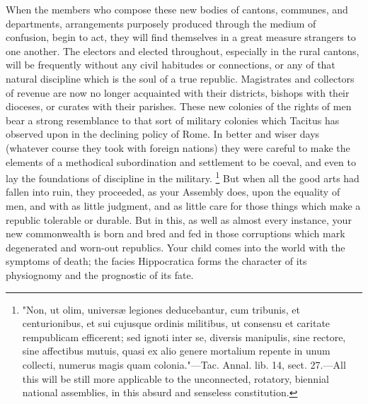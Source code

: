 When the members who compose these new bodies of cantons, communes, and departments, arrangements purposely produced through the medium of confusion, begin to act, they will find themselves in a great measure strangers to one another. The electors and elected throughout, especially in the rural cantons, will be frequently without any civil habitudes or connections, or any of that natural discipline which is the soul of a true republic. Magistrates and collectors of revenue are now no longer acquainted with their districts, bishops with their dioceses, or curates with their parishes. These new colonies of the rights of men bear a strong resemblance to that sort of military colonies which Tacitus has observed upon in the declining policy of Rome. In better and wiser days (whatever course they took with foreign nations) they were careful to make the elements of a methodical subordination and settlement to be coeval, and even to lay the foundations of discipline in the military.
\footnote{ "Non, ut olim, universæ legiones deducebantur, cum tribunis, et centurionibus, et sui cujusque ordinis militibus, ut consensu et caritate rempublicam efficerent; sed ignoti inter se, diversis manipulis, sine rectore, sine affectibus mutuis, quasi ex alio genere mortalium repente in unum collecti, numerus magis quam colonia."—Tac. Annal. lib. 14, sect. 27.—All this will be still more applicable to the unconnected, rotatory, biennial national assemblies, in this absurd and senseless constitution.}
 But when all the good arts had fallen into ruin, they proceeded, as your Assembly does, upon the equality of men, and with as little judgment, and as little care for those things which make a republic tolerable or durable. But in this, as well as almost every instance, your new commonwealth is born and bred and fed in those corruptions which mark degenerated and worn-out republics. Your child comes into the world with the symptoms of death; the facies Hippocratica forms the character of its physiognomy and the prognostic of its fate.

